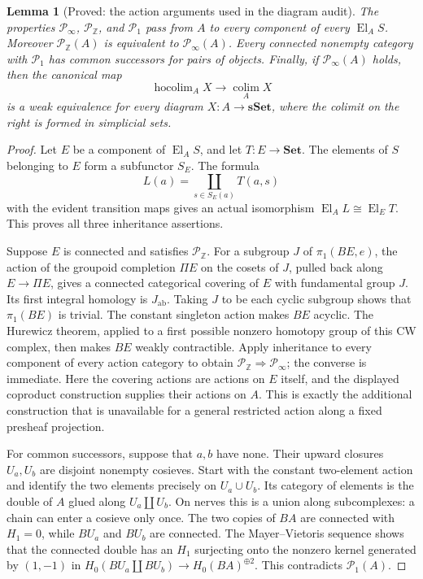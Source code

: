 \documentclass[11pt,a4paper]{article}
\newtheorem{lemma}[theorem]{Lemma}
\theoremstyle{definition}
\theoremstyle{remark}
\newcommand{\Set}{\mathbf{Set}}
\newcommand{\El}{\operatorname{El}}
\newcommand{\colim}{\operatorname*{colim}}
\begin{document}
\begin{lemma}[Proved: the action arguments used in the diagram audit]
\label{F:action-calculus}
The properties $\mathcal P_\infty$, $\mathcal P_{\mathbb Z}$, and
$\mathcal P_1$ pass from $A$ to every component of every $\El_A S$.
Moreover $\mathcal P_{\mathbb Z}(A)$ is equivalent to
$\mathcal P_\infty(A)$.  Every connected nonempty category with
$\mathcal P_1$ has common successors for pairs of objects.  Finally,
if $\mathcal P_\infty(A)$ holds, then the canonical map
\[
 \operatorname{hocolim}_A X\longrightarrow\colim_A X
\]
is a weak equivalence for every diagram $X:A\to\mathbf{sSet}$, where
the colimit on the right is formed in simplicial sets.
\end{lemma}
\begin{proof}
Let $E$ be a component of $\El_A S$, and let $T:E\to\Set$.
The elements of $S$ belonging to $E$ form a subfunctor $S_E$.
The formula
\[
 L(a)=\coprod_{s\in S_E(a)}T(a,s)
\]
with the evident transition maps gives an actual isomorphism
$\El_A L\cong\El_E T$.  This proves all three inheritance assertions.

Suppose $E$ is connected and satisfies $\mathcal P_{\mathbb Z}$.
For a subgroup $J$ of $\pi_1(BE,e)$, the action of the groupoid
completion $\Pi E$ on the cosets of $J$, pulled back along
$E\to\Pi E$, gives a connected categorical covering of $E$ with
fundamental group $J$.  Its first integral homology is $J_{\mathrm{ab}}$.
Taking $J$ to be each cyclic subgroup shows that $\pi_1(BE)$ is trivial.
The constant singleton action makes $BE$ acyclic.  The Hurewicz theorem,
applied to a first possible nonzero homotopy group of this CW complex,
then makes $BE$ weakly contractible.  Apply inheritance to every
component of every action category to obtain
$\mathcal P_{\mathbb Z}\Rightarrow\mathcal P_\infty$; the converse
is immediate.  Here the covering actions are actions on $E$ itself,
and the displayed coproduct construction supplies their actions on
$A$.  This is exactly the additional construction that is unavailable
for a general restricted action along a fixed presheaf projection.

For common successors, suppose that $a,b$ have none.  Their upward
closures $U_a,U_b$ are disjoint nonempty cosieves.  Start with the
constant two-element action and identify the two elements precisely
on $U_a\cup U_b$.  Its category of elements is the double of $A$
glued along $U_a\amalg U_b$.  On nerves this is a union along
subcomplexes: a chain can enter a cosieve only once.  The two copies
of $BA$ are connected with $H_1=0$, while $BU_a$ and $BU_b$ are
connected.  The Mayer--Vietoris sequence shows that the connected
double has an $H_1$ surjecting onto the nonzero kernel generated by
$(1,-1)$ in
$H_0(BU_a\amalg BU_b)\to H_0(BA)^{\oplus2}$.
This contradicts $\mathcal P_1(A)$.


\end{proof}
\end{document}
